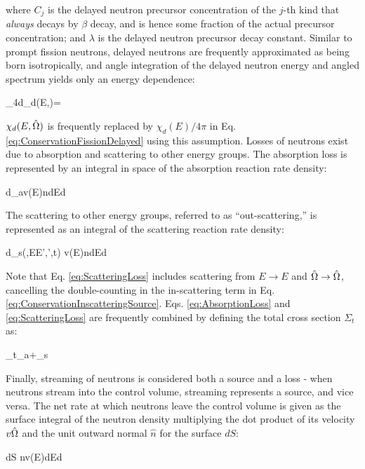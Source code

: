 where \(C_j\) is the delayed neutron precursor concentration of the \(j\)-th kind that {\it always} decays by \(\beta\) decay, and is hence some fraction of the actual precursor concentration; and \(\lambda\) is the delayed neutron precursor decay constant. Similar to prompt fission neutrons, delayed neutrons are frequently approximated as being born isotropically, and angle integration of the delayed neutron energy and angled spectrum yields only an energy dependence:

\beq
\label{eq:delayed_isotropic}
\int_{4\pi}d\hO \chi_d(E,\hO)=
\eeq

\(\chi_d(E,\hat{\Omega})\) is frequently replaced by \(\chi_d(E)/4\pi\) in Eq. \eqref{eq:ConservationFissionDelayed} using this assumption. Losses of neutrons exist due to absorption and scattering to other energy groups. The absorption loss is represented by an integral in space of the absorption reaction rate density:

\beq
\label{eq:AbsorptionLoss}
\left\lbrack\int d\volume \Sigma_a\seat v(E)n\seat\right\rbrack dEd\hO
\eeq

The scattering to other energy groups, referred to as ``out-scattering,'' is represented as an integral of the scattering reaction rate density:

\beq
\label{eq:ScatteringLoss}
\left\lbrack\int d\volume \Sigma_s(,E\rightarrow E',\hO\rightarrow\hO',t) v(E)n\seat\right\rbrack dEd\hO
\eeq

Note that Eq. \eqref{eq:ScatteringLoss} includes scattering from \(E\rightarrow E\) and \(\hat{\Omega}\rightarrow\hat{\Omega}\), cancelling the double-counting in the in-scattering term in Eq. \eqref{eq:ConservationInscatteringSource}. Eqs. \eqref{eq:AbsorptionLoss} and \eqref{eq:ScatteringLoss} are frequently combined by defining the total cross section \(\Sigma_t\) as:

\beq
\label{eq:TotalSigmaDef}
\Sigma_t\seatout\equiv\Sigma_a\seat+\Sigma_s\seatout
\eeq

Finally, streaming of neutrons is considered both a source and a loss - when neutrons stream into the control volume, streaming represents a source, and vice versa. The net rate at which neutrons leave the control volume is given as the surface integral of the neutron density multiplying the dot product of its velocity \(v\hat{\Omega}\) and the unit outward normal \(\hat{n}\) for the surface \(dS\):

\beq
\label{eq:streaming1}
\left\lbrack\int dS n\seat v(E)\hO\cdot{}\right\rbrack dEd\hO
\eeq

